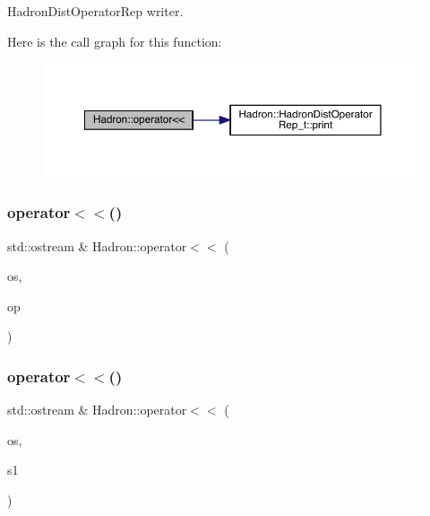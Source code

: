 Hadron\+Dist\+Operator\+Rep writer. 

Here is the call graph for this function\+:\nopagebreak
\begin{figure}[H]
\begin{center}
\leavevmode
\includegraphics[width=350pt]{d1/daf/namespaceHadron_a4ff4eac2687982e6a251bf3524940b01_cgraph}
\end{center}
\end{figure}
\mbox{\label{namespaceHadron_ac39a55fe17a7ba63e515041398ff55e4}} 
\subsubsection{\texorpdfstring{operator$<$$<$()}{operator<<()}\hspace{0.1cm}{\footnotesize\ttfamily [47/48]}}
{\footnotesize\ttfamily std\+::ostream \& Hadron\+::operator$<$$<$ (\begin{DoxyParamCaption}\item[{std\+::ostream \&}]{os,  }\item[{const \mbox{\hyperlink{structHadron_1_1KeySingleHadronQuarkFlavorColor__t}{Key\+Single\+Hadron\+Quark\+Flavor\+Color\+\_\+t}} \&}]{op }\end{DoxyParamCaption})}

\mbox{\label{namespaceHadron_aa68c7efacb8bc21a4d87aede8544def5}} 
\subsubsection{\texorpdfstring{operator$<$$<$()}{operator<<()}\hspace{0.1cm}{\footnotesize\ttfamily [48/48]}}
{\footnotesize\ttfamily std\+::ostream \& Hadron\+::operator$<$$<$ (\begin{DoxyParamCaption}\item[{std\+::ostream \&}]{os,  }\item[{const \mbox{\hyperlink{namespaceHadron_a03b319764f85c20434f20a269ce5f388}{Map\+Single\+Hadron\+Quark\+Flavor\+Color\+Spin\+\_\+t}} \&}]{s1 }\end{DoxyParamCaption})}


